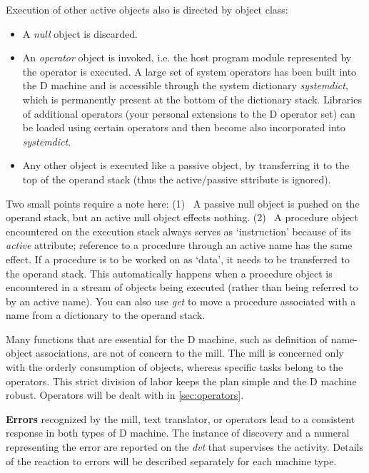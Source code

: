 Execution  of other active objects also is directed by object class:
\begin{itemize}
\item A \emph{null} object is discarded.
\item An \emph{operator}  object  is  invoked, i.e.  the  host  program  module represented  by the operator is executed.  A large set of system operators has been built into the D machine and is accessible through the system dictionary \emph{systemdict}, which is permanently present at the bottom of the dictionary stack. Libraries of additional operators (your personal extensions to the D operator set) can be loaded using certain operators and then become also incorporated into \emph{systemdict}.
\item Any other object is executed like a passive object,  by  transferring it to the top of the operand stack (thus the active/passive sttribute is ignored).
\end{itemize}

Two small points require a note here:  (1)~ A passive null object is pushed  on the  operand  stack,  but  an active null  object  effects  nothing.  (2)~ A procedure object  encountered on the execution stack always  serves  as `instruction' because of its \emph{active} attribute;  reference to a  procedure through  an  active name has the same effect.  If a procedure  is  to  be worked  on  as `data',  it needs to be transferred to the  operand  stack. This automatically happens when a procedure object is encountered in a stream of objects being executed (rather than being referred to by an active name). You can also use \emph{get} to move a procedure associated with a name from a dictionary to the operand stack.

Many functions that are essential for the D machine,  such as definition of name-object associations,  are not of concern to the mill. The mill is concerned only with the orderly consumption of objects,  whereas specific tasks   belong  to  the  operators.   This  strict  division   of   labor keeps  the plan simple and the D machine robust.  Operators will  be  dealt with in \ref{sec:operators}.

\textbf{Errors} recognized by the  mill,  text  translator,  or operators  lead  to a consistent response in both types of D machine. The instance  of  discovery and a numeral representing the  error are reported on the \emph{dvt} that supervises the activity. Details of the reaction to errors will be described separately for each machine type.

